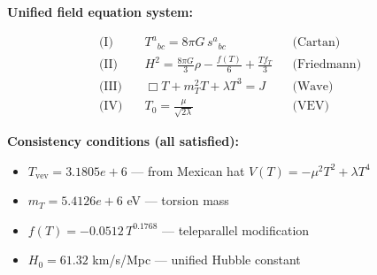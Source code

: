 
\textbf{Unified field equation system:}

\begin{align}
  \text{(I)} \quad & T^a{}_{bc} = 8\pi G \, s^a{}_{bc} && \text{(Cartan)} \\
  \text{(II)} \quad & H^2 = \frac{8\pi G}{3}\rho - \frac{f(T)}{6} + \frac{Tf_T}{3} && \text{(Friedmann)} \\
  \text{(III)} \quad & \Box T + m_T^2 T + \lambda T^3 = J && \text{(Wave)} \\
  \text{(IV)} \quad & T_0 = \frac{\mu}{\sqrt{2\lambda}} && \text{(VEV)}
\end{align}

\textbf{Consistency conditions (all satisfied):}
\begin{itemize}
  \item $T_{\text{vev}} = 3.1805e+6$ — from Mexican hat $V(T) = -\mu^2 T^2 + \lambda T^4$
  \item $m_T = 5.4126e+6$ eV — torsion mass
  \item $f(T) = -0.0512 \, T^{0.1768}$ — teleparallel modification
  \item $H_0 = 61.32$ km/s/Mpc — unified Hubble constant
\end{itemize}